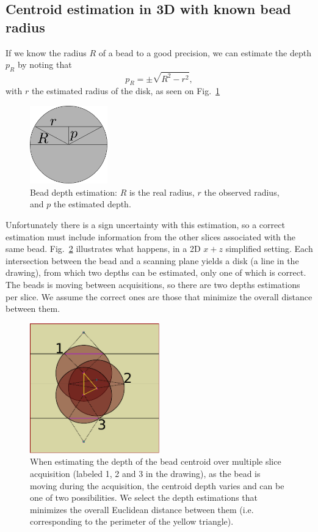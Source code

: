 \documentclass{llncs}
\begin{document}
\subsection{Centroid estimation in 3D with known bead radius}
If we know the radius $R$ of a bead to a good precision, we can estimate the depth $p_R$ by noting that
\begin{equation}
p_R = \pm\sqrt{R^2-r^2},\label{eq:depth}
\end{equation}
with $r$ the estimated radius of the disk, as seen on Fig.~\ref{fig:depth}

\begin{figure}
\centering
\includegraphics[width=0.3\textwidth]{images/depth.pdf}
\caption{Bead depth estimation: $R$ is the real radius, $r$ the observed radius, and $p$ the estimated depth.}
\label{fig:depth}
\end{figure}
Unfortunately there is a sign uncertainty with this estimation, so a correct estimation must include information from the other slices associated with the same bead. Fig.~\ref{fig:multidepth} illustrates what happens, in a 2D $x+z$ simplified setting. Each intersection between the bead and a scanning plane yields a disk (a line in the drawing), from which two depths can be estimated,  only one of which is correct. The beads is moving between acquisitions, so there are two depths estimations per slice. We assume the correct ones are those that minimize the overall distance between them.

\begin{figure}
\centering
\includegraphics[width=0.5\textwidth]{images/multidepth.pdf}
\caption{When estimating the depth of the bead centroid over multiple slice acquisition (labeled 1, 2 and 3 in the drawing), as the bead is moving during the acquisition, the centroid depth varies and can be one of two possibilities. We select the depth estimations that minimizes the overall Euclidean distance between them (i.e. corresponding to the perimeter of the yellow triangle).}
\label{fig:multidepth}
\end{figure}
\end{document}
